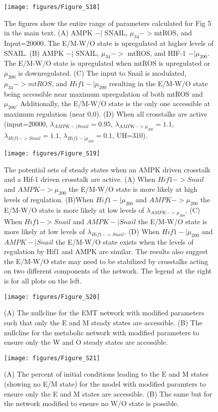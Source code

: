 \documentclass{article}
\begin{document}
\begin{figure}
\texttt{[image: figures/Figure\_S18]}
\caption{The figures show the entire range of parameters calculated for Fig 5 in the main text. (A) AMPK $-|$ SNAIL, $\mu_{34}->$mtROS, and Input=20000. The E/M-W/O state is upregulated at higher levels of SNAIL.  (B) AMPK $-|$ SNAIL, $\mu_{34}->$ mtROS, and HIF-1 $-|\mu_{200}$. The E/M-W/O state is upregulated when mtROS is upregulated or $\mu_{200}$ is downregulated. (C) The input to Snail is modulated, $\mu_{34}->mtROS$, and $Hif1-|\mu_{200}$ resulting in the E/M-W/O state being accessible near maximum upregulation of both mtROS and $\mu_{200}$. Additionally, the E/M-W/O state is the only one accessible at maximum regulation (near 0,0). (D) When all crosstalks are active (input=20000, $\lambda_{AMPK-|Snail} = 0.95$, $\lambda_{AMPK->\mu_{200}} =1.1$, $\lambda_{Hif1->Snail} = 1.1$,   $\lambda_{Hif1-|\mu_{200}} = 0.1$, UH=310).}
\end{figure}


\begin{figure}
\texttt{[image: figures/Figure\_S19]}
\caption{The potential sets of steady states when an AMPK driven crosstalk and a Hif-1 driven crosstalk are active. (A) When $Hif1 -> Snail$ and $AMPK -> \mu_{200}$ the E/M-W/O state is more likely at high levels of regulation. (B)When $Hif1 -| \mu_{200}$ and $AMPK -> \mu_{200}$ the E/M-W/O state is more likely at low levels of $\lambda_{AMPK->\mu_{200}}$. (C) When $Hif1 -> Snail$ and $AMPK -| Snail$ the E/M-W/O state is more likely at low  levels of $\lambda_{Hif1-> Snail}$. (D) When $Hif1 -| \mu_{200}$ and $AMPK -| Snail$ the E/M-W/O state exists when the levels of regulation by Hif1 and AMPK are similar. The results also suggest the E/M-W/O state may need to be stabilized by crosstalks acting on two different components of the network.  The legend at the right is for all plots on the left. }
\end{figure}


\begin{figure}
\texttt{[image: figures/Figure\_S20]}
\caption{(A) The nullcline for the EMT network with modified parameters such that only the E and M steady states are accessible. (B) The nullcline for the metabolic network with modified parameters to ensure only the W and O steady states are accessible. }
\end{figure}

\begin{figure}
\texttt{[image: figures/Figure\_S21]}
\caption{(A) The percent of initial conditions leading to the E and M states (showing no E/M state) for the model with modified paramters to ensure only the E and M states are accessible. (B) The same but for the network modified to ensure no W/O state is possible.}
\end{figure}
\end{document}
